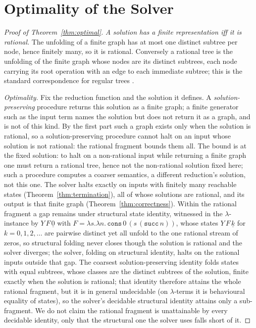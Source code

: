 \section{Optimality of the Solver}\label{app:optimal}
\begin{proof}[Proof of Theorem~\ref{thm:optimal}]
  \emph{A solution has a finite representation iff it is rational.} The unfolding of a finite
  graph has at most one distinct subtree per node, hence finitely many, so it is rational.
  Conversely a rational tree is the unfolding of the finite graph whose nodes are its
  distinct subtrees, each node carrying its root operation with an edge to each immediate
  subtree; this is the standard correspondence for regular trees \cite{courcelle1983-infinite-trees}.

  \emph{Optimality.} Fix the reduction function and the solution it defines. A
  \emph{solution-preserving} procedure returns this solution as a finite graph; a finite
  generator such as the input term names the solution but does not return it as a graph, and is
  not of this kind. By the first part such a graph exists only when the solution is rational, so a
  solution-preserving procedure cannot halt on an input whose solution is not rational: the
  rational fragment bounds them all. The bound is at the fixed solution: to halt on a non-rational
  input while returning a finite graph one must return a rational tree, hence not the non-rational
  solution fixed here; such a procedure computes a coarser semantics, a different reduction's
  solution, not this one. The solver halts exactly on inputs with finitely many reachable states
  (Theorem~\ref{thm:termination}), all of whose solutions are rational, and its output is that
  finite graph (Theorem~\ref{thm:correctness}). Within the rational fragment a gap remains under
  structural state identity, witnessed in the $\lambda$-instance by $Y\,F\,\underline{0}$ with
  $F = \lambda s.\lambda n.\,\mathtt{cons}\,0\,(s\,(\mathtt{succ}\,n))$, whose states
  $Y\,F\,\underline{k}$ for $k = 0, 1, 2, \dots$ are pairwise distinct yet all unfold to the one
  rational stream of zeros, so structural folding never closes though the solution is rational and
  the solver diverges; the solver, folding on structural identity, halts on the rational inputs
  outside that gap. The coarsest solution-preserving identity folds states with equal subtrees,
  whose classes are the distinct subtrees of the solution, finite exactly when the solution is
  rational; that identity therefore attains the whole rational fragment, but it is in general
  undecidable (on $\lambda$-terms it is behavioural equality of states), so the solver's decidable
  structural identity attains only a sub-fragment. We do not claim the rational fragment is
  unattainable by every decidable identity, only that the structural one the solver uses falls
  short of it.
\end{proof}

